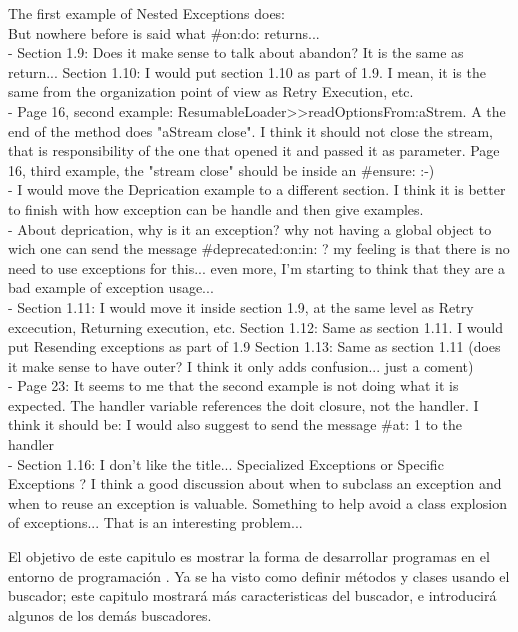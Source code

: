 \documentclass[a4paper,10pt,twoside]{book}
\begin{document}
{The first example of Nested Exceptions does:
\ct{result := [[ Error signal ....]}\\
But nowhere before is said what \#on:do: returns...  \\
- Section 1.9: Does it make sense to talk about abandon? It is the same as return... 
Section 1.10: I would put section 1.10 as part of 1.9. I mean, it is the same from the organization point of view as Retry Execution, etc. \\
- Page 16, second example: ResumableLoader>>readOptionsFrom:aStrem. A the end of the method does "aStream close". I think it should not close the stream, that is responsibility of the one that opened it and passed it as parameter.
Page 16, third example, the "stream close" should be inside an \#ensure: :-) \\
- I would move the Deprication example to a different section. I think it is better to finish with how exception can be handle and then give examples. \\
- About deprication, why is it an exception? why not having a global object to wich one can send the message \#deprecated:on:in: ? my feeling is that there is no need to use exceptions for this... even more, I'm starting to think that they are a bad example of exception usage... \\
- Section 1.11: I would move it inside section 1.9, at the same level as Retry excecution, Returning execution, etc.
Section 1.12: Same as section 1.11. I would put Resending exceptions as part of 1.9
Section 1.13: Same as section 1.11 (does it make sense to have outer? I think it only adds confusion... just a coment) \\
- Page 23: It seems to me that the second example is not doing what it is expected. The handler variable references the doit closure, not the handler. I think it should be:
I would also suggest to send the message \#at: 1 to the handler \\
- Section 1.16: I don't like the title... Specialized Exceptions or Specific Exceptions ?
I think a good discussion about when to subclass an exception and when to reuse an exception is valuable. Something to help avoid a class explosion of exceptions... That is an interesting problem... \\
}

El objetivo de este capitulo es mostrar la forma de desarrollar programas en el entorno de programaci\'on \pharo.
Ya se ha visto como definir m\'etodos y clases usando el buscador; este capitulo mostrar\'a m\'as caracteristicas del buscador, e introducir\'a algunos de los dem\'as buscadores.
\end{document}
